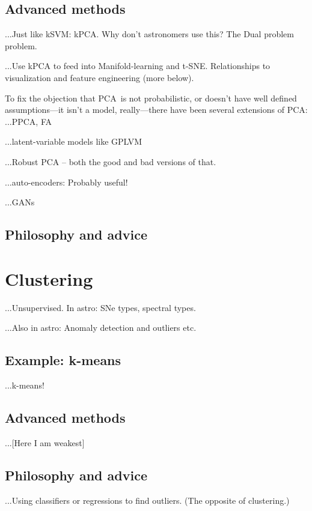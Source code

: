 \documentclass[12pt, twoside, letterpaper]{article}
\newcommand{\acronym}[1]{{\small{#1}}}
\newcommand{\PCA}{\acronym{PCA}}
\begin{document}
\subsection{Advanced methods}

...Just like kSVM: kPCA. Why don't astronomers use this? The Dual problem problem.

...Use kPCA to feed into Manifold-learning and t-SNE.
Relationships to visualization and feature engineering (more below).

To fix the objection that \PCA\ is not probabilistic, or doesn't have well
defined assumptions---it isn't a model, really---there have been several
extensions of \PCA:
...PPCA, FA

...latent-variable models like GPLVM

...Robust PCA -- both the good and bad versions of that.

...auto-encoders: Probably useful!

...GANs

\subsection{Philosophy and advice}

\section{Clustering}

...Unsupervised. In astro: SNe types, spectral types.

...Also in astro: Anomaly detection and outliers etc.

\subsection{Example: k-means}

...k-means!

\subsection{Advanced methods}

...[Here I am weakest]

\subsection{Philosophy and advice}

...Using classifiers or regressions to find outliers. (The opposite of clustering.)
\end{document}
